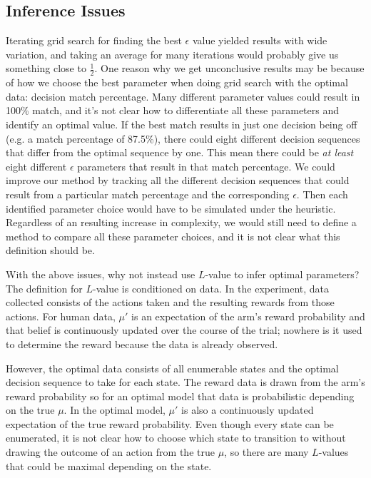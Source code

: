 \subsection{Inference Issues}
Iterating grid search for finding the best $\epsilon$ value yielded results with wide variation, and taking an average for many iterations would probably give us something close to $\frac{1}{2}$. One reason why we get unconclusive results may be because of how we choose the best parameter when doing grid search with the optimal data: decision match percentage. Many different parameter values could result in 100\% match, and it's not clear how to differentiate all these parameters and identify an optimal value. If the best match results in just one decision being off (e.g. a match percentage of 87.5\%), there could eight different decision sequences that differ from the optimal sequence by one. This mean there could be \textit{at least} eight different $\epsilon$ parameters that result in that match percentage. We could improve our method by tracking all the different decision sequences that could result from a particular match percentage and the corresponding $\epsilon$. Then each identified parameter choice would have to be simulated under the heuristic. Regardless of an resulting increase in complexity, we would still need to define a method to compare all these parameter choices, and it is not clear what this definition should be.

With the above issues, why not instead use $L$-value to infer optimal parameters? The definition for $L$-value is conditioned on data. In the experiment, data collected consists of the actions taken and the resulting rewards from those actions. For human data, $\mu'$ is an expectation of the arm's reward probability and that belief is continuously updated over the course of the trial; nowhere is it used to determine the reward because the data is already observed. 

However, the optimal data consists of all enumerable states and the optimal decision sequence to take for each state. The reward data is drawn from the arm's reward probability so for an optimal model that data is probabilistic depending on the true $\mu$. In the optimal model, $\mu'$ is also a continuously updated expectation of the true reward probability. Even though every state can be enumerated, it is not clear how to choose which state to transition to without drawing the outcome of an action from the true $\mu$, so there are many $L$-values that could be maximal depending on the state.


